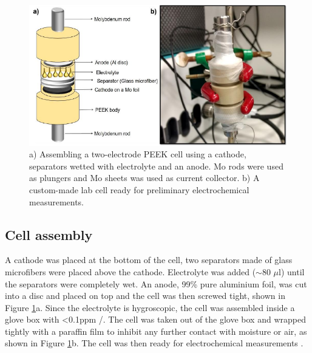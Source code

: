\begin{figure}[tbh!]
\centering
\includegraphics[width=\textwidth]{Figures/chap3fig/swagelok.pdf}
\caption{a) Assembling a two-electrode PEEK cell using a cathode, separators wetted with electrolyte and an anode. Mo rods were used as plungers and Mo sheets was used as current collector. b) A custom-made lab cell ready for preliminary electrochemical measurements.}
\label{Figures/chap3fig:swagelok}
\end{figure}

\subsection*{Cell assembly}
A cathode was placed at the bottom of the cell, two separators made of glass microfibers were placed above the cathode. Electrolyte was added ($\sim$80 $\mu$l) until the separators were completely wet. An anode, 99\% pure aluminium foil, was cut into a disc and placed on top and the cell was then screwed tight, shown in Figure \ref{Figures/chap3fig:swagelok}a. Since the electrolyte is hygroscopic, the cell was assembled inside a glove box with <0.1ppm /. The cell was taken out of the glove box and wrapped tightly with a paraffin film to inhibit any further contact with moisture or air, as shown in Figure \ref{Figures/chap3fig:swagelok}b. The cell was then ready for electrochemical measurements . 

